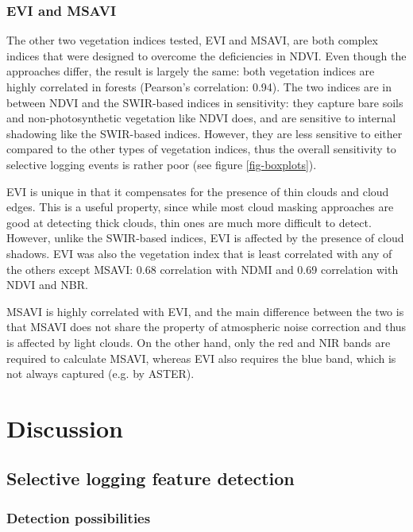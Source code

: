 \documentclass[a4paper,12pt]{scrbook}
\begin{document}
\subsection{EVI and MSAVI}

The other two vegetation indices tested, \ac{EVI} and \ac{MSAVI}, are both complex indices that were designed to overcome the deficiencies in \ac{NDVI}. Even though the approaches differ, the result is largely the same: both vegetation indices are highly correlated in forests (Pearson's correlation: 0.94). The two indices are in between \ac{NDVI} and the \ac{SWIR}-based indices in sensitivity: they capture bare soils and non-photosynthetic vegetation like \ac{NDVI} does, and are sensitive to internal shadowing like the \ac{SWIR}-based indices. However, they are less sensitive to either compared to the other types of vegetation indices, thus the overall sensitivity to selective logging events is rather poor (see figure \ref{fig-boxplots}).

\ac{EVI} is unique in that it compensates for the presence of thin clouds and cloud edges. This is a useful property, since while most cloud masking approaches are good at detecting thick clouds, thin ones are much more difficult to detect. However, unlike the \ac{SWIR}-based indices, \ac{EVI} is affected by the presence of cloud shadows. \ac{EVI} was also the vegetation index that is least correlated with any of the others except \ac{MSAVI}: 0.68 correlation with \ac{NDMI} and 0.69 correlation with \ac{NDVI} and \ac{NBR}.

\ac{MSAVI} is highly correlated with \ac{EVI}, and the main difference between the two is that \ac{MSAVI} does not share the property of atmospheric noise correction and thus is affected by light clouds. On the other hand, only the red and \ac{NIR} bands are required to calculate \ac{MSAVI}, whereas \ac{EVI} also requires the blue band, which is not always captured (e.g. by \ac{ASTER}).

\chapter{Discussion}

\section{Selective logging feature detection}

\subsection{Detection possibilities}
\end{document}

